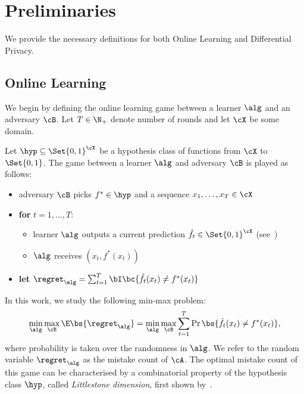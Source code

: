 \section{Preliminaries}\label{sec:prelim}
We provide the necessary definitions for both Online Learning and Differential Privacy. 
\subsection{Online Learning} We begin by defining the online learning game between a learner \(\alg\) and an adversary \(\cB\). Let \(T \in \N_+\) denote number of rounds and let \(\cX\) be some domain.
\begin{definition}
\label{def:general}
    Let  \(\hyp \subseteq \Set{0, 1}^{\cX}\) be a hypothesis class of functions from \(\cX\) to \(\Set{0, 1}\). The game between a learner \(\alg\) and adversary \(\cB\) is played as follows:
\begin{mdframed}[nobreak=true]
\begin{itemize}
    \item adversary \(\cB\) picks \(f^{\ast} \in \hyp\) and a sequence \(x_1, \ldots, x_T \in \cX\)
    \item \textbf{for} \(t = 1, \ldots, T\):
    \begin{itemize}
        \item learner \(\alg\) outputs a current prediction \(\hat f_t \in \Set{0, 1}^{\cX}\) (see~)
        \item \(\alg\) receives \((x_t, f^{\ast}(x_t))\)
    \end{itemize}
    \item \textbf{let} \(\regret_{\alg}  = \sum_{t = 1}^T \bI\bc{\hat f_t(x_t) \neq f^{\ast}(x_t)}\)
\end{itemize}
\end{mdframed}
\end{definition}
In this work, we study the following min-max problem:
\begin{equation}\label{eq:mistake-bound}
    \min_{\alg}\max_{\cB} \E \bs{\regret_{\alg}} = \min_{\alg} \max_{\cB} \sum_{t = 1}^T \Pr\bs{\hat f_t(x_t) \neq f^{\ast}(x_t)},
\end{equation}
where probability is taken over the randomness in \(\alg\). We refer to the random variable \(\regret_{\alg}\) as the mistake count of \(\cA\). The optimal mistake count of this game can be characterised by a combinatorial property of the hypothesis class \(\hyp\), called \emph{Littlestone dimension}, first shown by~\citet{littlestone1988learning}.

